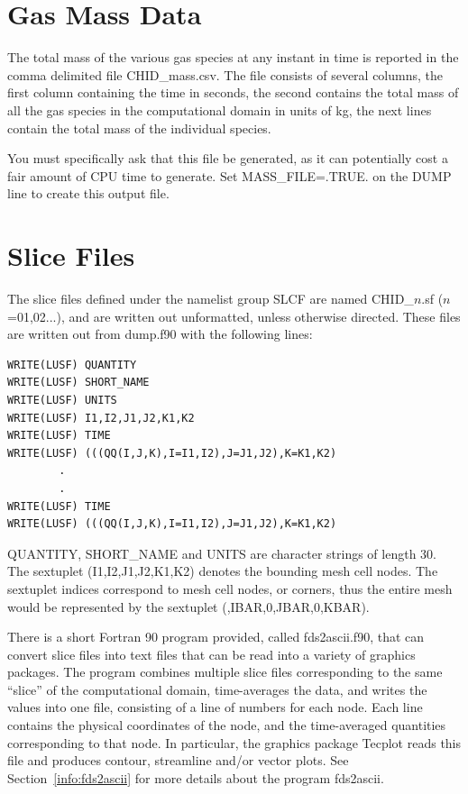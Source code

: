\documentclass[11pt]{book}
\begin{document}
\section{Gas Mass Data}

The total mass of the various gas species at any instant in time is reported in the comma delimited file {\ct CHID\_mass.csv}. The file consists of several columns, the first column containing the time in seconds, the second contains the total mass of all the gas species in the computational domain in units of kg, the next lines contain the total mass of the individual species.

You must specifically ask that this file be generated, as it can potentially cost a fair amount of CPU time to generate. Set {\ct MASS\_FILE=.TRUE.} on the {\ct DUMP} line to create this output file.


\section{Slice Files}
\label{out:SLCF}

The slice files defined under the namelist group {\ct SLCF} are named {\ct CHID\_$n$.sf} ($n$=01,02...), and are written out unformatted, unless otherwise directed. These files are written out from {\ct dump.f90} with the following lines:
\begin{lstlisting}
WRITE(LUSF) QUANTITY
WRITE(LUSF) SHORT_NAME
WRITE(LUSF) UNITS
WRITE(LUSF) I1,I2,J1,J2,K1,K2
WRITE(LUSF) TIME
WRITE(LUSF) (((QQ(I,J,K),I=I1,I2),J=J1,J2),K=K1,K2)
        .
        .
WRITE(LUSF) TIME
WRITE(LUSF) (((QQ(I,J,K),I=I1,I2),J=J1,J2),K=K1,K2)
\end{lstlisting}
{\ct QUANTITY}, {\ct SHORT\_NAME} and {\ct UNITS} are character strings of length 30. The sextuplet ({\ct I1,I2,J1,J2,K1,K2}) denotes the bounding mesh cell nodes. The sextuplet indices correspond to mesh cell nodes, or corners, thus the entire mesh would be represented by the sextuplet ({,IBAR,0,JBAR,0,KBAR}).

There is a short Fortran 90 program provided, called {\ct fds2ascii.f90}, that can convert slice files into text files that can be read into a variety of graphics packages. The program combines multiple slice files corresponding to the same ``slice'' of the computational domain, time-averages the data, and writes the values into one file, consisting of a line of numbers for each node. Each line contains the physical coordinates of the node, and the time-averaged quantities corresponding to that node. In particular, the graphics package Tecplot reads this file and produces contour, streamline and/or vector plots. See Section~\ref{info:fds2ascii} for more details about the program {\ct fds2ascii}.
\end{document}
